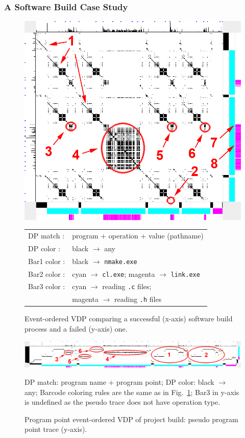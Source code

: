 \subsubsection{A Software Build Case Study}
\label{sec:build}

\begin{figure}[htbp]
\begin{center}
\includegraphics[width=0.8\columnwidth]{lviz/make-fail.png}
\caption{Event-ordered VDP comparing a successful (x-axis)
software build process and a failed (y-axis) one.
\label{fig:make-fail}
}
\begin{tabular}{ll}
DP match : & program + operation + value (pathname)\\
DP color : & black $\rightarrow$ any\\
Bar1 color : & black $\rightarrow$ {\tt nmake.exe}\\
Bar2 color : & cyan $\rightarrow$ {\tt cl.exe}; magenta $\rightarrow$ {\tt link.exe}\\
Bar3 color : & cyan $\rightarrow$ reading {\tt .c} files;\\
 & magenta $\rightarrow$ reading {\tt .h} files
\end{tabular}
\end{center}
\end{figure}

\begin{figure}[htb]
\includegraphics[width=1.0\textwidth]{lviz/make-pp.png}
\caption{Program point event-ordered VDP of project build: pseudo program point trace (y-axis).}
DP match: program name + program point;
DP color: black $\rightarrow$ any;
Barcode coloring rules are the same as in Fig.~\ref{fig:make-fail};
Bar3 in y-axis is undefined as the pseudo trace does not have operation type.
\label{fig:make-pp}
\end{figure}

